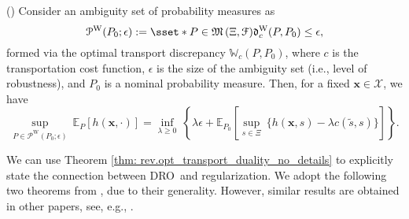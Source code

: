 \documentclass[final,onefignum,onetabnum]{class}
\newcommand{\ee}[2]{\mathbb{E}_{#1} \left[ #2 \right]}
\newcommand{\bs}[1]{\boldsymbol{#1}} %
\newcommand{\Bs}[1]{\mathbb{#1}} %
\newcommand{\Ts}[1]{\mathbbmtt{#1}} %
\newcommand{\Cs}[1]{\mathcal{#1}} %
\newcommand{\Fs}[1]{\mathfrak{#1}} %
\newcommand{\txi}{\tilde{\bs{\xi}}}
\newcommand{\measurespace}{\left( \Xi, \Cs{F} \right)}
\newcommand{\dro}{DRO}
\begin{document}
\begin{theorem}{(\citet[Remark~1]{blanchet2017DRO})}
     \label{thm: rev.opt_transport_duality_no_details}
     Consider an ambiguity set of probability measures as $$\Cs{P}^{\text{W}}(P_{0}; \epsilon):=\sset*{P\in\Fs{M}\measurespace}{\Fs{d}^{\text{W}}_{c}(P,P_{0})\le \epsilon},$$ formed via the optimal transport discrepancy $\Bs{W}_{c}(P,P_{0})$, where $c$ is the transportation cost function, $\epsilon$ is the size of the ambiguity set (i.e., level of robustness), and $P_{0}$ is a nominal probability measure. %
      Then, for a fixed $\bs{x} \in \Cs{X}$, we have 
     $$
     \sup_{P \in \Cs{P}^{\text{W}}(P_{0};\epsilon) } \ 	\ee{P}{h(\bs{x},\cdot)} = 
     \inf_{\lambda \ge 0} \ \left\lbrace \lambda \epsilon +  \ee{P_{0}}{\sup_{s \in \Xi} \ \{h(\bs{x},s)- \lambda c(\tilde{s},s)\}} \right\rbrace.$$
\end{theorem}
We can use Theorem \ref{thm: rev.opt_transport_duality_no_details} to explicitly state the connection between \dro\ and regularization. We adopt the following two theorems from \citet{blanchet2017DRO}, due to their generality. However, similar results are obtained in other papers, see, e.g., \citet{shafieezadeh2015,gao2016}. 
\end{document}

